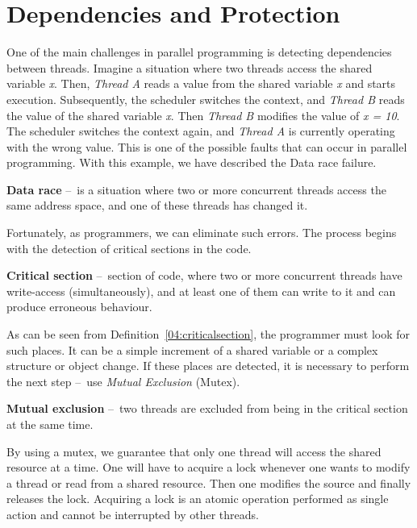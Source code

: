 \section{Dependencies and Protection}
\label{dependenciesandprotection}

One of the main challenges in parallel programming is detecting dependencies between threads.
Imagine a situation where two threads access the shared variable \emph{x}. Then, \emph{Thread A} reads a value from the shared variable \emph{x} and starts execution.
Subsequently, the scheduler switches the context, and \emph{Thread B} reads the value of the shared variable \emph{x}. Then \emph{Thread B} modifies the value of \emph{x = 10}.
The scheduler switches the context again, and \emph{Thread A} is currently operating with the wrong value.
This is one of the possible faults that can occur in parallel programming.
With this example, we have described the Data race failure.

\begin{definition}
    \textbf{Data race} \---\ is a situation where two or more concurrent threads access the same address space, and one of these threads has changed it.
\end{definition}
Fortunately, as programmers, we can eliminate such errors.
The process begins with the detection of critical sections in the code.
\begin{definition}
    \label{04:criticalsection}
    \textbf{Critical section} \---\ section of code, where two or more concurrent threads have write-access (simultaneously), and at least one of them can write to it and can produce erroneous behaviour.
\end{definition}
As can be seen from Definition~\ref{04:criticalsection}, the programmer must look for such places.
It can be a simple increment of a shared variable or a complex structure or object change.
If these places are detected, it is necessary to perform the next step \---\ use \emph{Mutual Exclusion} (Mutex).
\begin {definition}
    \textbf{Mutual exclusion} \---\ two threads are excluded from being in the critical section at the same time.
\end {definition}
By using a mutex, we guarantee that only one thread will access the shared resource at a time.
One will have to acquire a lock whenever one wants to modify a thread or read from a shared resource.
Then one modifies the source and finally releases the lock.
Acquiring a lock is an atomic operation performed as single action and cannot be interrupted by other threads.

